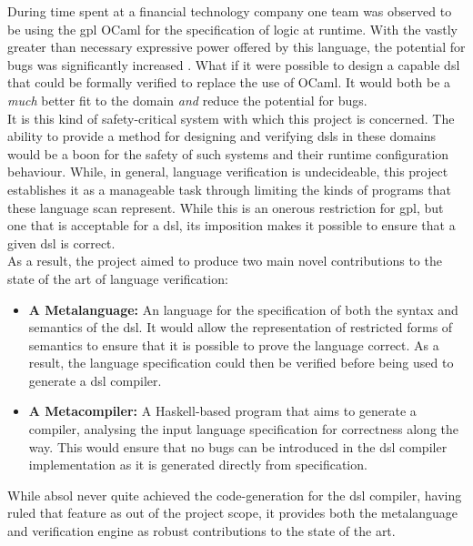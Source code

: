 During time spent at a financial technology company one team was observed to be using the \gls{gpl} OCaml for the specification of logic at runtime. 
With the vastly greater than necessary expressive power offered by this language, the potential for bugs was significantly increased \citep{subramanyam2003empirical}.
What if it were possible to design a capable \gls{dsl} that could be formally verified to replace the use of OCaml.
It would both be a \textit{much} better fit to the domain \textit{and} reduce the potential for bugs.\\

It is this kind of safety-critical system with which this project is concerned.
The ability to provide a method for designing and verifying \glspl{dsl} in these domains would be a boon for the safety of such systems and their runtime configuration behaviour.
While, in general, language verification is undecideable, this project establishes it as a manageable task through limiting the kinds of programs that these language scan represent.
While this is an onerous restriction for \gls{gpl}, but one that is acceptable for a \gls{dsl}, its imposition makes it possible to ensure that a given \gls{dsl} is correct.\\

As a result, the project aimed to produce two main novel contributions to the state of the art of language verification:
\begin{itemize}
    \item \textbf{A Metalanguage:} An language for the specification of both the \gls{syntax} and \gls{semantics} of the \gls{dsl}. 
    It would allow the representation of restricted forms of semantics to ensure that it is possible to prove the language correct.
    As a result, the language specification could then be verified before being used to generate a \gls{dsl} compiler. 
    \item \textbf{A Metacompiler:} A Haskell-based program that aims to generate a compiler, analysing the input language specification for correctness along the way.
    This would ensure that no bugs can be introduced in the \gls{dsl} compiler implementation as it is generated directly from specification.
\end{itemize}

While \gls{absol} never quite achieved the code-generation for the \gls{dsl} compiler, having ruled that feature as out of the project scope, it provides both the metalanguage and verification engine as robust contributions to the state of the art. 

